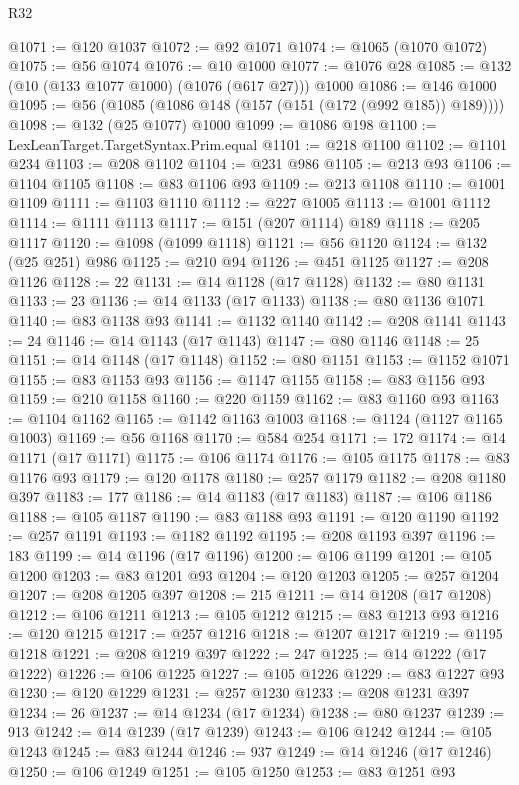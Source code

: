 \begin{lexlean}{R32}
\begin{coremodule}
@1071 := @120 @1037
@1072 := @92 @1071
@1074 := @1065 (@1070 @1072)
@1075 := @56 @1074
@1076 := @10 @1000
@1077 := @1076 @28
@1085 := @132 (@10 (@133 @1077 @1000) (@1076 (@617 @27))) @1000
@1086 := @146 @1000
@1095 := @56 (@1085 (@1086 @148 (@157 (@151 (@172 (@992 @185)) @189))))
@1098 := @132 (@25 @1077) @1000
@1099 := @1086 @198
@1100 := LexLeanTarget.TargetSyntax.Prim.equal
@1101 := @218 @1100
@1102 := @1101 @234
@1103 := @208 @1102
@1104 := @231 @986
@1105 := @213 @93
@1106 := @1104 @1105
@1108 := @83 @1106 @93
@1109 := @213 @1108
@1110 := @1001 @1109
@1111 := @1103 @1110
@1112 := @227 @1005
@1113 := @1001 @1112
@1114 := @1111 @1113
@1117 := @151 (@207 @1114) @189
@1118 := @205 @1117
@1120 := @1098 (@1099 @1118)
@1121 := @56 @1120
@1124 := @132 (@25 @251) @986
@1125 := @210 @94
@1126 := @451 @1125
@1127 := @208 @1126
@1128 := 22
@1131 := @14 @1128 (@17 @1128)
@1132 := @80 @1131
@1133 := 23
@1136 := @14 @1133 (@17 @1133)
@1138 := @80 @1136 @1071
@1140 := @83 @1138 @93
@1141 := @1132 @1140
@1142 := @208 @1141
@1143 := 24
@1146 := @14 @1143 (@17 @1143)
@1147 := @80 @1146
@1148 := 25
@1151 := @14 @1148 (@17 @1148)
@1152 := @80 @1151
@1153 := @1152 @1071
@1155 := @83 @1153 @93
@1156 := @1147 @1155
@1158 := @83 @1156 @93
@1159 := @210 @1158
@1160 := @220 @1159
@1162 := @83 @1160 @93
@1163 := @1104 @1162
@1165 := @1142 @1163 @1003
@1168 := @1124 (@1127 @1165 @1003)
@1169 := @56 @1168
@1170 := @584 @254
@1171 := 172
@1174 := @14 @1171 (@17 @1171)
@1175 := @106 @1174
@1176 := @105 @1175
@1178 := @83 @1176 @93
@1179 := @120 @1178
@1180 := @257 @1179
@1182 := @208 @1180 @397
@1183 := 177
@1186 := @14 @1183 (@17 @1183)
@1187 := @106 @1186
@1188 := @105 @1187
@1190 := @83 @1188 @93
@1191 := @120 @1190
@1192 := @257 @1191
@1193 := @1182 @1192
@1195 := @208 @1193 @397
@1196 := 183
@1199 := @14 @1196 (@17 @1196)
@1200 := @106 @1199
@1201 := @105 @1200
@1203 := @83 @1201 @93
@1204 := @120 @1203
@1205 := @257 @1204
@1207 := @208 @1205 @397
@1208 := 215
@1211 := @14 @1208 (@17 @1208)
@1212 := @106 @1211
@1213 := @105 @1212
@1215 := @83 @1213 @93
@1216 := @120 @1215
@1217 := @257 @1216
@1218 := @1207 @1217
@1219 := @1195 @1218
@1221 := @208 @1219 @397
@1222 := 247
@1225 := @14 @1222 (@17 @1222)
@1226 := @106 @1225
@1227 := @105 @1226
@1229 := @83 @1227 @93
@1230 := @120 @1229
@1231 := @257 @1230
@1233 := @208 @1231 @397
@1234 := 26
@1237 := @14 @1234 (@17 @1234)
@1238 := @80 @1237
@1239 := 913
@1242 := @14 @1239 (@17 @1239)
@1243 := @106 @1242
@1244 := @105 @1243
@1245 := @83 @1244
@1246 := 937
@1249 := @14 @1246 (@17 @1246)
@1250 := @106 @1249
@1251 := @105 @1250
@1253 := @83 @1251 @93

\end{coremodule}
\end{lexlean}
